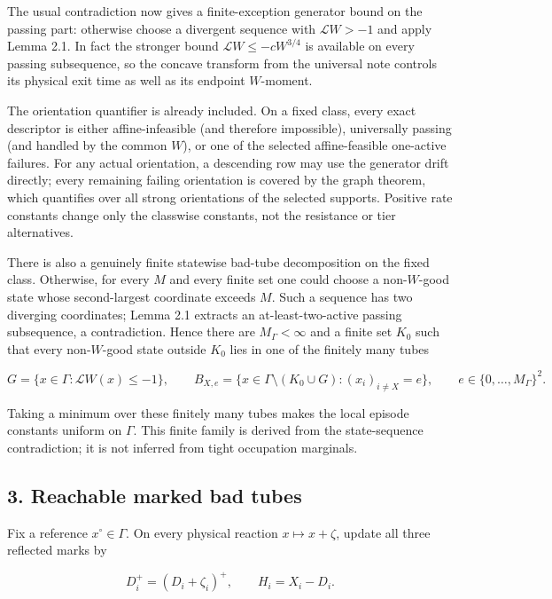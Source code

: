 The usual contradiction now gives a finite-exception generator bound on
the passing part: otherwise choose a divergent sequence with
\(\mathcal L W>-1\) and apply Lemma 2.1. In fact the stronger bound
\(\mathcal L W\le-cW^{3/4}\) is available on every passing subsequence,
so the concave transform from the universal note controls its physical
exit time as well as its endpoint \(W\)-moment.

The orientation quantifier is already included. On a fixed class, every
exact descriptor is either affine-infeasible (and therefore impossible),
universally passing (and handled by the common \(W\)), or one of the
selected affine-feasible one-active failures. For any actual
orientation, a descending row may use the generator drift directly;
every remaining failing orientation is covered by the graph theorem,
which quantifies over all strong orientations of the selected supports.
Positive rate constants change only the classwise constants, not the
resistance or tier alternatives.

There is also a genuinely finite statewise bad-tube decomposition on the
fixed class. Otherwise, for every \(M\) and every finite set one could
choose a non-\(W\)-good state whose second-largest coordinate exceeds
\(M\). Such a sequence has two diverging coordinates; Lemma 2.1 extracts
an at-least-two-active passing subsequence, a contradiction. Hence there
are \(M_\Gamma<\infty\) and a finite set \(K_0\) such that every
non-\(W\)-good state outside \(K_0\) lies in one of the finitely many
tubes

\[
 G=\{x\in\Gamma:\mathcal L W(x)\le-1\},
 \qquad
 B_{X,e}=\{x\in\Gamma\setminus(K_0\cup G):(x_i)_{i\ne X}=e\},
 \qquad e\in\{0,\ldots,M_\Gamma\}^2.                \tag{2.1}
\]

Taking a minimum over these finitely many tubes makes the local episode
constants uniform on \(\Gamma\). This finite family is derived from the
state-sequence contradiction; it is not inferred from tight occupation
marginals.

\subsection{3. Reachable marked bad
tubes}

Fix a reference \(x^\circ\in\Gamma\). On every physical reaction
\(x\mapsto x+\zeta\), update all three reflected marks by

\[
 D_i^+=(D_i+\zeta_i)^+,
 \qquad H_i=X_i-D_i.                                \tag{3.1}
\]

